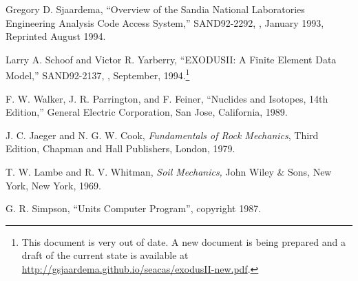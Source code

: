 \begin{thebibliography}{9}

Gregory D. Sjaardema,
``Overview of the Sandia National Laboratories Engineering Analysis Code Access System,''
SAND92-2292,
\SNLA,
January 1993, Reprinted August 1994.

Larry A. Schoof and Victor R. Yarberry,
``EXODUSII: A Finite Element Data Model,''
SAND92-2137,
\SNLA,
September, 1994.\footnote{This document is very out of date.  A new
document is being prepared and a draft of the current state is
available at \url{http://gsjaardema.github.io/seacas/exodusII-new.pdf}.}

F. W. Walker, J. R. Parrington, and F. Feiner, ``Nuclides and
Isotopes, 14th Edition,'' General Electric Corporation, San Jose, California, 1989.

J. C. Jaeger and N. G. W. Cook, \textit{Fundamentals of Rock
Mechanics}, Third Edition, Chapman and Hall Publishers, London, 1979.

T. W. Lambe and R. V. Whitman, \textit{Soil Mechanics,} John
Wiley \& Sons, New York, New York, 1969.

G. R. Simpson, ``Units Computer Program'', copyright 1987.


\end{thebibliography}
